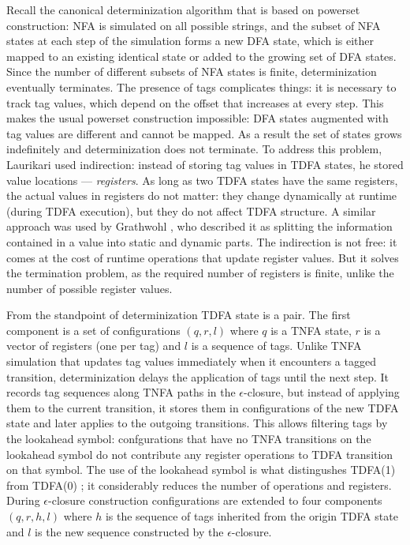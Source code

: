 \documentclass[]{article}
\begin{document}
Recall the canonical determinization algorithm that is based on powerset construction:
NFA is simulated on all possible strings,
and the subset of NFA states at each step of the simulation forms a new DFA state,
which is either mapped to an existing identical state or added to the growing set of DFA states.
Since the number of different subsets of NFA states is finite, determinization eventually terminates.
%
The presence of tags complicates things: it is necessary to track tag values, which depend on the offset that increases at every step.
This makes the usual powerset construction impossible: DFA states augmented with tag values are different and cannot be mapped.
As a result the set of states grows indefinitely and determinization does not terminate.
%
To address this problem, Laurikari used indirection: instead of storing tag values in TDFA states, he stored value locations --- \emph{registers}.
As long as two TDFA states have the same registers, the actual values in registers do not matter:
they change dynamically at runtime (during TDFA execution), but they do not affect TDFA structure.
A similar approach was used by Grathwohl \cite{Gra15}, who described it as splitting the information contained in a value into static and dynamic parts.
The indirection is not free: it comes at the cost of runtime operations that update register values.
But it solves the termination problem, as the required number of registers is finite, unlike the number of possible register values.
\medskip

From the standpoint of determinization TDFA state is a pair.
The first component is a set of configurations $(q, r, l)$ where
$q$ is a TNFA state,
$r$ is a vector of registers (one per tag) and
$l$ is a sequence of tags.
Unlike TNFA simulation that updates tag values immediately when it encounters a tagged transition,
determinization delays the application of tags until the next step.
%
It records tag sequences along TNFA paths in the $\epsilon$-closure,
but instead of applying them to the current transition,
it stores them in configurations of the new TDFA state
and later applies to the outgoing transitions.
%
This allows filtering tags by the lookahead symbol:
confgurations that have no TNFA transitions on the lookahead symbol
do not contribute any register operations to TDFA transition on that symbol.
The use of the lookahead symbol is what distingushes TDFA(1) from TDFA(0) \cite{Tro17};
it considerably reduces the number of operations and registers.
During $\epsilon$-closure construction configurations are extended to four components $(q, r, h, l)$
where $h$ is the sequence of tags inherited from the origin TDFA state
and $l$ is the new sequence constructed by the $\epsilon$-closure.
\medskip
\end{document}
